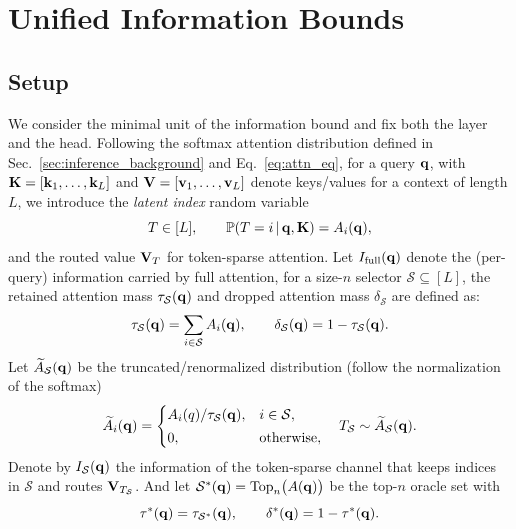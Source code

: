 

\section{Unified Information Bounds}
\label{sec:app_uib}
\subsection{Setup}

We consider the minimal unit of the information bound and fix both the layer and the head. Following the softmax attention distribution defined in Sec.~\ref{sec:inference_background} and Eq.~\ref{eq:attn_eq}, for a query $\mathbf{q}$, with $\mathbf{K}=[\mathbf{k}_1,\dots,\mathbf{k}_L]$ and $\mathbf{V}=[\mathbf{v}_1,\dots,\mathbf{v}_L]$ denote keys/values for a context of length $L$, we introduce the \emph{latent index} random variable
\begin{equation}
    T\in[L],\qquad \mathbb P(T=i\,|\,\mathbf{q},\mathbf{K})=A_i(\mathbf{q}),
\end{equation}
and the routed value $\mathbf{V}_T$ for token-sparse attention. Let $I_{\mathrm{full}}(\mathbf{q})$ denote the (per-query) information carried by full attention, for a size-$n$ selector $\mathcal S\subseteq [L]$, the retained attention mass $\tau_{\mathcal S}(\mathbf{q})$ and dropped attention mass $\delta_{\mathcal S}$ are defined as:
\begin{equation}
    \tau_{\mathcal S}(\mathbf{q})=\sum_{i\in\mathcal S}A_i(\mathbf{q}),\qquad
\delta_{\mathcal S}(\mathbf{q})=1-\tau_{\mathcal S}(\mathbf{q}).
\end{equation}
Let $\widetilde A_{\mathcal S}(\mathbf{q})$ be the truncated/renormalized distribution (follow the normalization of the softmax)
\begin{equation}
    \widetilde A_i(\mathbf{q})=
    \begin{cases}
    A_i(q)/\tau_{\mathcal S}(\mathbf{q}), & i\in\mathcal S,\\[2pt]
    0,& \text{otherwise},
    \end{cases}
    \quad
    T_{\mathcal S}\sim \widetilde A_{\mathcal S}(\mathbf{q}).
\end{equation}
Denote by $I_{\mathcal S}(\mathbf{q})$ the information of the token-sparse channel that keeps indices in $\mathcal S$ and routes $\mathbf{V}_{T_{\mathcal S}}$. And let $\mathcal S^{*}(\mathbf{q})=\operatorname*{Top}_n\!\big(A(\mathbf{q})\big)$ be the top-$n$ oracle set with
\begin{equation}
\label{eq:oracle_attn_mass}
    \tau^{*}(\mathbf{q})=\tau_{\mathcal S^{*}}(\mathbf{q}),\qquad \delta^{*}(\mathbf{q})=1-\tau^{*}(\mathbf{q}).
\end{equation}


